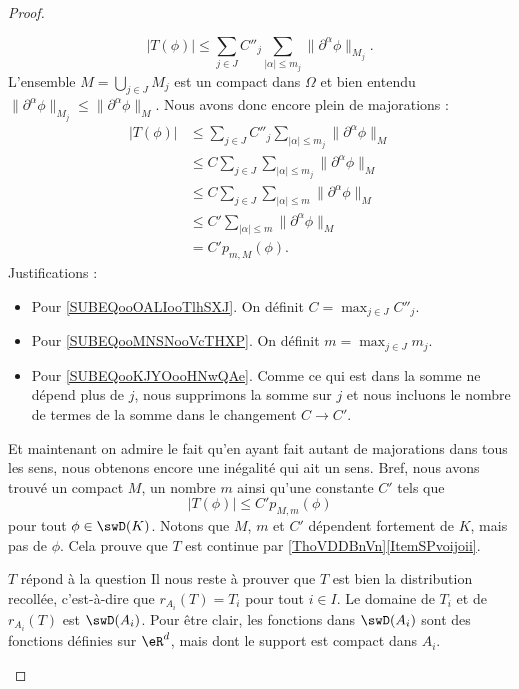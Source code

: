 \begin{proof}
\begin{subproof}
        \begin{equation}
            | T(\phi) |\leq \sum_{j\in J}C''_j\sum_{| \alpha |\leq m_j}\| \partial^{\alpha}\phi \|_{M_j}.
        \end{equation}
        L'ensemble \( M=\bigcup_{j\in J}M_j\) est un compact dans \( \Omega\) et bien entendu \( \| \partial^{\alpha}\phi \|_{M_j}\leq \| \partial^{\alpha}\phi \|_M\). Nous avons donc encore plein de majorations :
        \begin{subequations}
            \begin{align}
                | T(\phi) |&\leq \sum_{j\in J}C''_j\sum_{| \alpha |\leq m_j}\| \partial^{\alpha}\phi \|_M\\
                &\leq C\sum_{j\in J}\sum_{| \alpha |\leq m_j}\| \partial^{\alpha}\phi \|_M  \label{SUBEQooOALIooTlhSXJ}\\
                &\leq C\sum_{j\in J}\sum_{| \alpha |\leq m}\| \partial^{\alpha}\phi \|_M    \label{SUBEQooMNSNooVcTHXP}\\
                &\leq C'\sum_{| \alpha |\leq m}\| \partial^{\alpha}\phi \|_M \label{SUBEQooKJYOooHNwQAe}\\
                &=C'p_{m,M}(\phi).
            \end{align}
        \end{subequations}
        Justifications :
        \begin{itemize}
            \item Pour \ref{SUBEQooOALIooTlhSXJ}. On définit \( C=\max_{j\in J}C''_j\).
            \item Pour \ref{SUBEQooMNSNooVcTHXP}. On définit \( m=\max_{j\in J}m_j\).
            \item Pour \ref{SUBEQooKJYOooHNwQAe}. Comme ce qui est dans la somme ne dépend plus de \( j\), nous supprimons la somme sur \( j\) et nous incluons le nombre de termes de la somme dans le changement \( C\to C'\).
        \end{itemize}
        Et maintenant on admire le fait qu'en ayant fait autant de majorations dans tous les sens, nous obtenons encore une inégalité qui ait un sens. Bref, nous avons trouvé un compact \( M\), un nombre \( m\) ainsi qu'une constante \( C'\) tels que
        \begin{equation}
            | T(\phi) |\leq C'p_{M,m}(\phi)
        \end{equation}
        pour tout \( \phi\in \swD(K)\). Notons que \( M\), \( m\) et \( C'\) dépendent fortement de \( K\), mais pas de \( \phi\). Cela prouve que \( T\) est continue par \ref{ThoVDDBnVn}\ref{ItemSPvoijoii}.
    \item[$ T$ répond à la question]
        Il nous reste à prouver que \( T\) est bien la distribution recollée, c'est-à-dire que \( r_{A_i}(T)=T_i\) pour tout \( i\in I\). Le domaine de \( T_i\) et de \( r_{A_i}(T)\) est \( \swD(A_i)\). Pour être clair, les fonctions dans \( \swD(A_i)\) sont des fonctions définies sur \( \eR^d\), mais dont le support est compact dans \( A_i\).


\end{subproof}
\end{proof}
